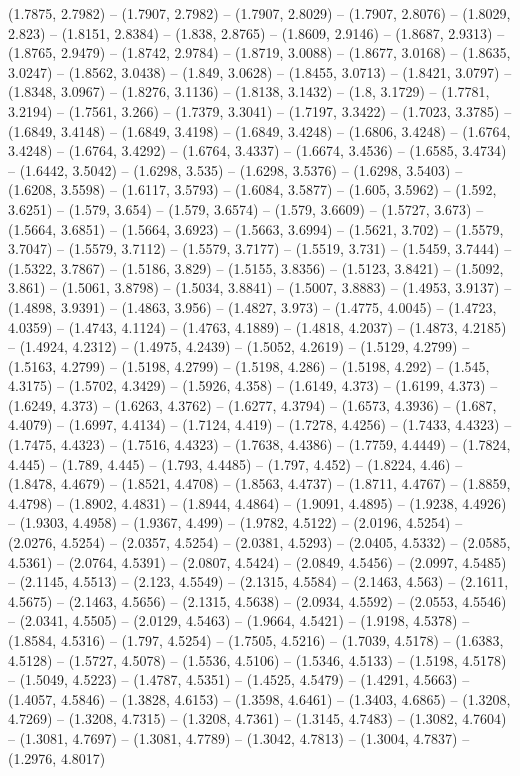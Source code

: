 (1.7875, 2.7982) -- (1.7907, 2.7982) -- (1.7907, 2.8029) -- (1.7907, 2.8076) -- (1.8029, 2.823) -- (1.8151, 2.8384) -- (1.838, 2.8765) -- (1.8609, 2.9146) -- (1.8687, 2.9313) -- (1.8765, 2.9479) -- (1.8742, 2.9784) -- (1.8719, 3.0088) -- (1.8677, 3.0168) -- (1.8635, 3.0247) -- (1.8562, 3.0438) -- (1.849, 3.0628) -- (1.8455, 3.0713) -- (1.8421, 3.0797) -- (1.8348, 3.0967) -- (1.8276, 3.1136) -- (1.8138, 3.1432) -- (1.8, 3.1729) -- (1.7781, 3.2194) -- (1.7561, 3.266) -- (1.7379, 3.3041) -- (1.7197, 3.3422) -- (1.7023, 3.3785) -- (1.6849, 3.4148) -- (1.6849, 3.4198) -- (1.6849, 3.4248) -- (1.6806, 3.4248) -- (1.6764, 3.4248) -- (1.6764, 3.4292) -- (1.6764, 3.4337) -- (1.6674, 3.4536) -- (1.6585, 3.4734) -- (1.6442, 3.5042) -- (1.6298, 3.535) -- (1.6298, 3.5376) -- (1.6298, 3.5403) -- (1.6208, 3.5598) -- (1.6117, 3.5793) -- (1.6084, 3.5877) -- (1.605, 3.5962) -- (1.592, 3.6251) -- (1.579, 3.654) -- (1.579, 3.6574) -- (1.579, 3.6609) -- (1.5727, 3.673) -- (1.5664, 3.6851) -- (1.5664, 3.6923) -- (1.5663, 3.6994) -- (1.5621, 3.702) -- (1.5579, 3.7047) -- (1.5579, 3.7112) -- (1.5579, 3.7177) -- (1.5519, 3.731) -- (1.5459, 3.7444) -- (1.5322, 3.7867) -- (1.5186, 3.829) -- (1.5155, 3.8356) -- (1.5123, 3.8421) -- (1.5092, 3.861) -- (1.5061, 3.8798) -- (1.5034, 3.8841) -- (1.5007, 3.8883) -- (1.4953, 3.9137) -- (1.4898, 3.9391) -- (1.4863, 3.956) -- (1.4827, 3.973) -- (1.4775, 4.0045) -- (1.4723, 4.0359) -- (1.4743, 4.1124) -- (1.4763, 4.1889) -- (1.4818, 4.2037) -- (1.4873, 4.2185) -- (1.4924, 4.2312) -- (1.4975, 4.2439) -- (1.5052, 4.2619) -- (1.5129, 4.2799) -- (1.5163, 4.2799) -- (1.5198, 4.2799) -- (1.5198, 4.286) -- (1.5198, 4.292) -- (1.545, 4.3175) -- (1.5702, 4.3429) -- (1.5926, 4.358) -- (1.6149, 4.373) -- (1.6199, 4.373) -- (1.6249, 4.373) -- (1.6263, 4.3762) -- (1.6277, 4.3794) -- (1.6573, 4.3936) -- (1.687, 4.4079) -- (1.6997, 4.4134) -- (1.7124, 4.419) -- (1.7278, 4.4256) -- (1.7433, 4.4323) -- (1.7475, 4.4323) -- (1.7516, 4.4323) -- (1.7638, 4.4386) -- (1.7759, 4.4449) -- (1.7824, 4.445) -- (1.789, 4.445) -- (1.793, 4.4485) -- (1.797, 4.452) -- (1.8224, 4.46) -- (1.8478, 4.4679) -- (1.8521, 4.4708) -- (1.8563, 4.4737) -- (1.8711, 4.4767) -- (1.8859, 4.4798) -- (1.8902, 4.4831) -- (1.8944, 4.4864) -- (1.9091, 4.4895) -- (1.9238, 4.4926) -- (1.9303, 4.4958) -- (1.9367, 4.499) -- (1.9782, 4.5122) -- (2.0196, 4.5254) -- (2.0276, 4.5254) -- (2.0357, 4.5254) -- (2.0381, 4.5293) -- (2.0405, 4.5332) -- (2.0585, 4.5361) -- (2.0764, 4.5391) -- (2.0807, 4.5424) -- (2.0849, 4.5456) -- (2.0997, 4.5485) -- (2.1145, 4.5513) -- (2.123, 4.5549) -- (2.1315, 4.5584) -- (2.1463, 4.563) -- (2.1611, 4.5675) -- (2.1463, 4.5656) -- (2.1315, 4.5638) -- (2.0934, 4.5592) -- (2.0553, 4.5546) -- (2.0341, 4.5505) -- (2.0129, 4.5463) -- (1.9664, 4.5421) -- (1.9198, 4.5378) -- (1.8584, 4.5316) -- (1.797, 4.5254) -- (1.7505, 4.5216) -- (1.7039, 4.5178) -- (1.6383, 4.5128) -- (1.5727, 4.5078) -- (1.5536, 4.5106) -- (1.5346, 4.5133) -- (1.5198, 4.5178) -- (1.5049, 4.5223) -- (1.4787, 4.5351) -- (1.4525, 4.5479) -- (1.4291, 4.5663) -- (1.4057, 4.5846) -- (1.3828, 4.6153) -- (1.3598, 4.6461) -- (1.3403, 4.6865) -- (1.3208, 4.7269) -- (1.3208, 4.7315) -- (1.3208, 4.7361) -- (1.3145, 4.7483) -- (1.3082, 4.7604) -- (1.3081, 4.7697) -- (1.3081, 4.7789) -- (1.3042, 4.7813) -- (1.3004, 4.7837) -- (1.2976, 4.8017) 